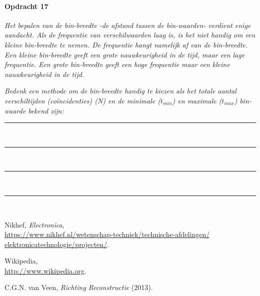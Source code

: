 \bigskip{}


\begin{minipage}[t]{1\columnwidth}

\paragraph{Opdracht 17}

\textit{Het bepalen van de bin-breedte -de afstand tussen de bin-waarden-
verdient enige aandacht. Als de frequentie van verschilwaarden laag
is, is het niet handig om een kleine bin-breedte te nemen. De frequentie
hangt namelijk af van de bin-breedte. Een kleine bin-breedte geeft
een grote nauwkeurigheid in de tijd, maar een lage frequentie. Een
grote bin-breedte geeft een hoge frequentie maar een kleine nauwkeurigheid
in de tijd.}

\textit{Bedenk een methode om de bin-breedte handig te kiezen als
het totale aantal verschiltijden (coïncidenties) (N) en de minimale
($t_{min}$) en maximale ($t_{max}$) bin-waarde bekend zijn:}

\begin{center}
    \rule{\textwidth}{0.3mm}\\
    \rule{\textwidth}{0.3mm}\\
    \rule{\textwidth}{0.3mm}\\
    \rule{\textwidth}{0.3mm}\\
\end{center}
\end{minipage}


\begin{thebibliography}{9}
     Nikhef, \emph{\hisparc Electronica},\\
    \url{https://www.nikhef.nl/wetenschap-techniek/technische-afdelingen/
         elektronicatechnologie/projecten/}.

     Wikipedia, \\
    \url{http://www.wikipedia.org}.

     C.G.N. van Veen, \emph{Richting
    Reconstructie} (2013).
\end{thebibliography}


